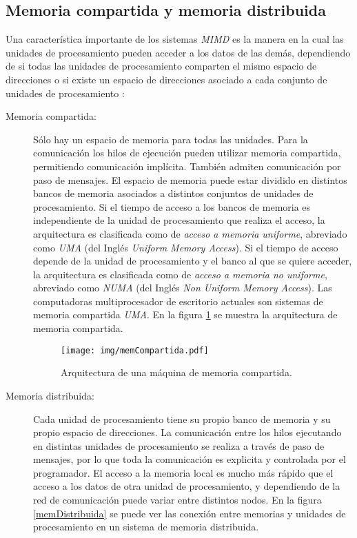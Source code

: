 \subsection{Memoria compartida y memoria distribuida}

Una característica importante de los sistemas \emph{MIMD} es la manera en la
cual las unidades de procesamiento pueden acceder a los datos de las demás,
dependiendo de si todas las unidades de procesamiento comparten el mismo espacio
de direcciones o si existe un espacio de direcciones asociado a cada conjunto de
unidades de procesamiento \cite{introToPC2002, anIntroToPP2011}:

\begin{description}

	\item[Memoria compartida:] Sólo hay un espacio de memoria para todas las
		unidades. Para la comunicación los hilos de ejecución pueden
		utilizar memoria compartida, permitiendo comunicación
		implícita. También admiten comunicación por paso de mensajes. El
		espacio de memoria puede estar dividido en distintos bancos de
		memoria asociados a distintos conjuntos de unidades de
		procesamiento. Si el tiempo de acceso a los bancos de memoria es
		independiente de la unidad de procesamiento que realiza el
		acceso, la arquitectura es clasificada como de \emph{acceso a
		memoria uniforme}, abreviado como \emph{UMA} (del Inglés
		\emph{Uniform Memory Access}). Si el tiempo de acceso depende de
		la unidad de procesamiento y el banco al que se quiere acceder,
		la arquitectura es clasificada como de \emph{acceso a memoria no
		uniforme}, abreviado como \emph{NUMA} (del Inglés \emph{Non
		Uniform Memory Access}). Las computadoras multiprocesador de
		escritorio actuales son sistemas de memoria compartida
		\emph{UMA}. En la figura \ref{memCompartida} se muestra la
		arquitectura de memoria compartida.

\begin{figure}[!htb]

	\centering
	\texttt{[image: img/memCompartida.pdf]}
	\caption{Arquitectura de una máquina de memoria compartida.}

	\label{memCompartida}

\end{figure}

	\item[Memoria distribuida:] Cada unidad de procesamiento tiene su propio
		banco de memoria y su propio espacio de direcciones. La
		comunicación entre los hilos ejecutando en distintas unidades de
		procesamiento se realiza a través de paso de mensajes, por lo
		que toda la comunicación es explicita y controlada por el
		programador. El acceso a la memoria local es mucho más rápido
		que el acceso a los datos de otra unidad de procesamiento, y
		dependiendo de la red de comunicación puede variar entre
		distintos nodos. En la figura \ref{memDistribuida} se puede ver
		las conexión entre memorias y unidades de procesamiento en un
		sistema de memoria distribuida.


\end{description}
